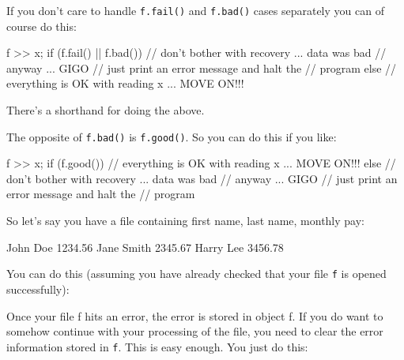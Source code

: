 \begin{consolethree}[escapeinside=||]
If you don't care to handle \texttt{f.fail()} and
\texttt{f.bad()} cases separately you can of course do this:

\begin{console}
f >> x;
if (f.fail() || f.bad())
{   
    // don't bother with recovery ... data was bad
    // anyway ... GIGO
    // just print an error message and halt the
    // program
}
else
{   
    // everything is OK with reading x ... MOVE ON!!!
}
\end{console}

There's a shorthand for doing the above.

The opposite of \texttt{f.bad()} is \texttt{f.good()}. So you can do this if you like:

\begin{console}
f >> x;
if (f.good())
{    
     // everything is OK with reading x ... MOVE ON!!!
}
else
{   
     // don't bother with recovery ... data was bad
     // anyway ... GIGO
     // just print an error message and halt the
     // program
} 
\end{console}

So let's say you have a file containing first name, last name, monthly pay:

\begin{console}
John Doe 1234.56
Jane Smith 2345.67
Harry Lee 3456.78
\end{console}

You can do this (assuming you have already checked that your file \texttt{f} is opened successfully):

\begin{console}
double total = 0.0;
bool error = false;
while (!f.eof())
{   
     char[100] fname;
     char[100] lname;
     double pay;
     f >> fname >> lname >> pay;
     if (f.good())
     {
          total += pay;
          std::cout << fname << ' ' << lname
                    << " is paid "
                    << pay << std::endl;
}
else
{    
     error = true;
     break;
}
if (!error) // or use f.good()
{    
     std::cout << "total: " << total << std::endl;
}
else
{
std::cout << "DATA IN FILE IS CORRUPTED!!!"
          << std::endl;
}
\end{console}

\newpage{}

Once your file f hits an error, the error is stored in object f. If you do want to somehow continue with your processing of the file, you need to clear the error information stored in \texttt{f}. This is easy enough. You just do this:


\end{consolethree}
